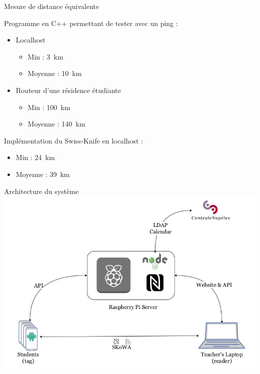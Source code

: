 \documentclass[aspectratio=169]{beamer}
\begin{document}
\begin{frame}{Mesure de distance équivalente}

    Programme en C++ permettant de tester avec un ping :
    \begin{itemize}
        \item Localhost
              \begin{itemize}
                  \item Min : \SI{3}{\kilo\meter}
                  \item Moyenne : \SI{10}{\kilo\meter}
              \end{itemize}
        \item Routeur d'une résidence étudiante
              \begin{itemize}
                  \item Min : \SI{100}{\kilo\meter}
                  \item Moyenne : \SI{140}{\kilo\meter}
              \end{itemize}
    \end{itemize}

    \bigskip

    Implémentation du Swiss-Knife en localhost :
    \begin{itemize}
        \item Min : \SI{24}{\kilo\meter}
        \item Moyenne : \SI{39}{\kilo\meter}
    \end{itemize}

\end{frame}

\begin{frame}{Architecture du système}
    \centering
    \includegraphics[height=0.8\textheight]{../assets/architecture.png}
\end{frame}
\end{document}
